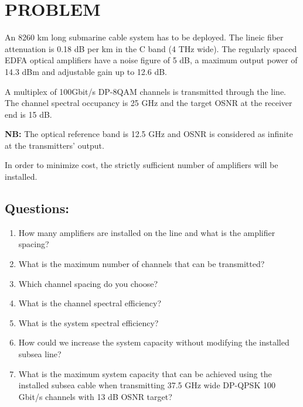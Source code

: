 \documentclass[a4paper,11pt]{article}
\begin{document}
\newpage

\section*{PROBLEM}

An 8260 km long submarine cable system has to be deployed. The lineic fiber attenuation is 0.18 dB per km in the C band (4 THz wide). The regularly spaced EDFA optical amplifiers have a noise figure of 5 dB, a maximum output power of 14.3 dBm and adjustable gain up to 12.6 dB.

A multiplex of 100Gbit/s DP-8QAM channels is transmitted through the line. The channel spectral occupancy is 25 GHz and the target OSNR at the receiver end is 15 dB.

\textbf{NB:} The optical reference band is 12.5 GHz and OSNR is considered as infinite at the transmitters' output.

In order to minimize cost, the strictly sufficient number of amplifiers will be installed.

\subsection*{Questions:}

\begin{enumerate}
    \item How many amplifiers are installed on the line and what is the amplifier spacing?
    
    \vspace{3cm}
    
    \item What is the maximum number of channels that can be transmitted?
    
    \vspace{3cm}
    
    \item Which channel spacing do you choose?
    
    \vspace{3cm}
    
    \item What is the channel spectral efficiency?
    
    \vspace{3cm}
    
    \item What is the system spectral efficiency?
    
    \vspace{3cm}
    
    \item How could we increase the system capacity without modifying the installed subsea line?
    
    \vspace{3cm}
    
    \item What is the maximum system capacity that can be achieved using the installed subsea cable when transmitting 37.5 GHz wide DP-QPSK 100 Gbit/s channels with 13 dB OSNR target?
    
    \vspace{3cm}
\end{enumerate}
\end{document}
